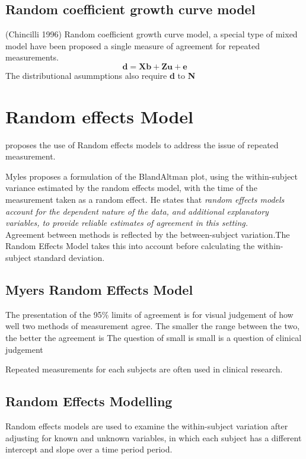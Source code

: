 \documentclass[12pt, a4paper]{report}
\theoremstyle{plain}
\theoremstyle{definition}
\theoremstyle{remark}
\begin{document}
\subsection{Random coefficient growth curve model} (Chincilli
1996) Random coefficient growth curve model, a special type of
mixed model have been proposed a single measure of agreement for
repeated measurements.
\begin{equation}
\textbf{d}= \textbf{Xb} + \textbf{Zu} + \textbf{e}
\end{equation}
The distributional asummptions also require \textbf{d} to
\textbf{N}


\section{Random effects Model} \citet{Myles} proposes the use of
Random effects models to address the issue of repeated
measurement. 

Myles proposes a formulation of the BlandAltman
plot, using the within-subject variance estimated by the random
effects model, with the time of the measurement taken as a random
effect. He states that \emph{random effects models account for the
	dependent nature of the data, and additional explanatory
	variables, to provide reliable estimates of agreement in this
	setting.}
\\
Agreement between methods is reflected by the between-subject
variation.The Random Effects Model takes this into account before
calculating the within-subject standard deviation.

\subsection{Myers Random Effects Model} The presentation of the
95\% limits of agreement is for visual judgement of how well two
methods of measurement agree. The smaller the range between the
two, the better the agreement is The question of small is small is
a question of clinical judgement


Repeated measurements for each subjects are often used in clinical
research.



\subsection{Random Effects Modelling}
Random effects models are used to examine the within-subject
variation after adjusting for known and unknown variables, in
which each subject has a different intercept and slope over a time
period period.
\end{document}
